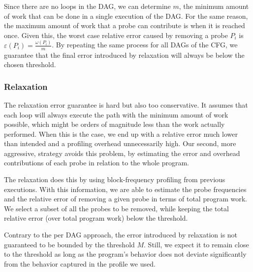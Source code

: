     Since there are no loops in the DAG, we can determine $m$, the minimum amount of work that can be done in a single execution of the
    DAG. For the same reason, the maximum amount of work that a probe can contribute is when it is reached once. Given this, the worst case
    relative error caused by removing a probe $P_i$ is $\varepsilon(P_i) = \frac{\omega(P_i)}{m}$. By repeating the same process for
    all DAGs of the CFG, we guarantee that the final error introduced by relaxation will always be below the chosen threshold.

    \subsubsection{\WPRelaxTitle Relaxation}

    The \WCRelaxLower relaxation error guarantee is hard but also too conservative. It assumes that each loop will always execute the
    path with the minimum amount of work possible, which might be orders of magnitude less than the work actually performed. When this is
    the case, we end up with a relative error much lower than intended and a profiling overhead unnecessarily high. Our second, more
    aggressive, strategy avoids this problem, by estimating the error and overhead contributions of each probe in relation to the whole
    program.

    The \WPRelaxLower relaxation does this by using block-frequency profiling from previous executions. With this information, we are able
    to estimate the probe frequencies and the relative error of removing a given probe in terms of total program work. We select a subset
    of all the probes to be removed, while keeping the total relative error (over total program work) below the threshold.

    Contrary to the per DAG approach, the error introduced by \WPRelaxLower relaxation is not guaranteed to be bounded by the threshold
    $M$. Still, we expect it to remain close to the threshold as long as the program's behavior does not deviate significantly from the
    behavior captured in the profile we used.
